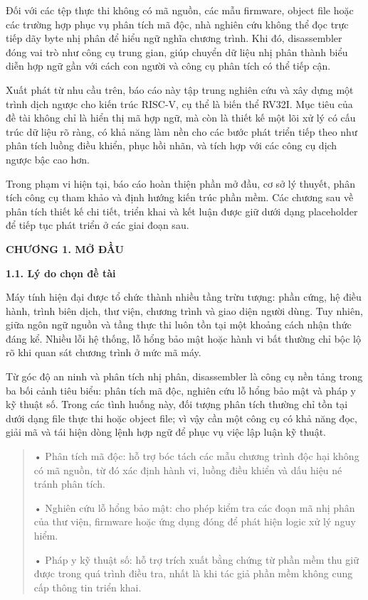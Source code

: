 \documentclass[
]{article}
\begin{document}
Đối với các tệp thực thi không có mã nguồn, các mẫu firmware, object
file hoặc các trường hợp phục vụ phân tích mã độc, nhà nghiên cứu không
thể đọc trực tiếp dãy byte nhị phân để hiểu ngữ nghĩa chương trình. Khi
đó, disassembler đóng vai trò như công cụ trung gian, giúp chuyển dữ
liệu nhị phân thành biểu diễn hợp ngữ gần với cách con người và công cụ
phân tích có thể tiếp cận.

Xuất phát từ nhu cầu trên, báo cáo này tập trung nghiên cứu và xây dựng
một trình dịch ngược cho kiến trúc RISC-V, cụ thể là biến thể RV32I. Mục
tiêu của đề tài không chỉ là hiển thị mã hợp ngữ, mà còn là thiết kế một
lõi xử lý có cấu trúc dữ liệu rõ ràng, có khả năng làm nền cho các bước
phát triển tiếp theo như phân tích luồng điều khiển, phục hồi nhãn, và
tích hợp với các công cụ dịch ngược bậc cao hơn.

Trong phạm vi hiện tại, báo cáo hoàn thiện phần mở đầu, cơ sở lý thuyết,
phân tích công cụ tham khảo và định hướng kiến trúc phần mềm. Các chương
sau về phân tích thiết kế chi tiết, triển khai và kết luận được giữ dưới
dạng placeholder để tiếp tục phát triển ở các giai đoạn sau.

\textbf{CHƯƠNG 1. MỞ ĐẦU}

\textbf{1.1. Lý do chọn đề tài}

Máy tính hiện đại được tổ chức thành nhiều tầng trừu tượng: phần cứng,
hệ điều hành, trình biên dịch, thư viện, chương trình và giao diện người
dùng. Tuy nhiên, giữa ngôn ngữ nguồn và tầng thực thi luôn tồn tại một
khoảng cách nhận thức đáng kể. Nhiều lỗi hệ thống, lỗ hổng bảo mật hoặc
hành vi bất thường chỉ bộc lộ rõ khi quan sát chương trình ở mức mã máy.

Từ góc độ an ninh và phân tích nhị phân, disassembler là công cụ nền
tảng trong ba bối cảnh tiêu biểu: phân tích mã độc, nghiên cứu lỗ hổng
bảo mật và pháp y kỹ thuật số. Trong các tình huống này, đối tượng phân
tích thường chỉ tồn tại dưới dạng file thực thi hoặc object file; vì vậy
cần một công cụ có khả năng đọc, giải mã và tái hiện dòng lệnh hợp ngữ
để phục vụ việc lập luận kỹ thuật.

\begin{quote}
• Phân tích mã độc: hỗ trợ bóc tách các mẫu chương trình độc hại không
có mã nguồn, từ đó xác định hành vi, luồng điều khiển và dấu hiệu né
tránh phân tích.

• Nghiên cứu lỗ hổng bảo mật: cho phép kiểm tra các đoạn mã nhị phân của
thư viện, firmware hoặc ứng dụng đóng để phát hiện logic xử lý nguy
hiểm.

• Pháp y kỹ thuật số: hỗ trợ trích xuất bằng chứng từ phần mềm thu giữ
được trong quá trình điều tra, nhất là khi tác giả phần mềm không cung
cấp thông tin triển khai.
\end{quote}
\end{document}
